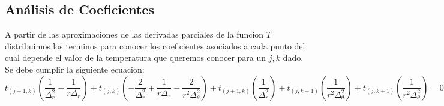 \subsection{Análisis de Coeficientes}
A partir de las aproximaciones de las derivadas parciales de la funcion $T$ distribuimos los terminos para conocer los coeficientes asociados a cada punto del cual depende el valor de la temperatura que queremos conocer para un $j,k$ dado. Se debe cumplir la siguiente ecuacion: \\
$$t_{(j-1, k)} (\frac{1}{\Delta^2_r}-\frac{1}{r \Delta_r}) +
t_{(j, k)} (-\frac{2}{\Delta^2_r}+\frac{1}{r \Delta_r}-\frac{2}{r^2 \Delta^2_\theta}) + 
t_{(j+1, k)} (\frac{1}{\Delta^2_r}) + 
t_{(j, k-1)} (\frac{1}{r^2 \Delta^2_\theta}) +
t_{(j, k+1)} (\frac{1}{r^2 \Delta^2_\theta}) = 0 $$ \\

